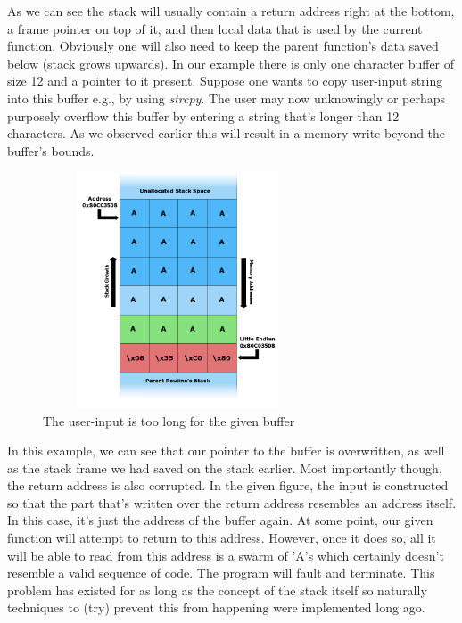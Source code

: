 \documentclass[10pt,twocolumn,a4paper]{article}
\begin{document}
As we can see the stack will usually contain a return address right at the bottom, a frame pointer on top of it, and then local data that is used by the current function.
Obviously one will also need to keep the parent function's data saved below (stack grows upwards).
In our example there is only one character buffer of size 12 and a pointer to it present.
Suppose one wants to copy user-input string into this buffer e.g., by using \emph{strcpy}.
The user may now unknowingly or perhaps purposely overflow this buffer by entering a string that's longer than 12 characters.
As we observed earlier this will result in a memory-write beyond the buffer's bounds. 
\begin{figure}[h]
	\begin{center}
		\includegraphics[height=7cm,width=8cm]{fig/Stack_Overflow2}
		\caption{The user-input is too long for the given buffer}
	\end{center}
\end{figure}
\newline 
In this example, we can see that our pointer to the buffer is overwritten, as well as the stack frame we had saved on the stack earlier.
Most importantly though, the return address is also corrupted.
In the given figure, the input is constructed so that the part that's written over the return address resembles an address itself.
In this case, it's just the address of the buffer again.
At some point, our given function will attempt to return to this address.
However, once it does so, all it will be able to read from this address is a swarm of  'A's which certainly doesn't resemble a valid sequence of code.
The program will fault and terminate.
This problem has existed for as long as the concept of the stack itself so naturally techniques to (try) prevent this from happening were implemented long ago.
\end{document}
